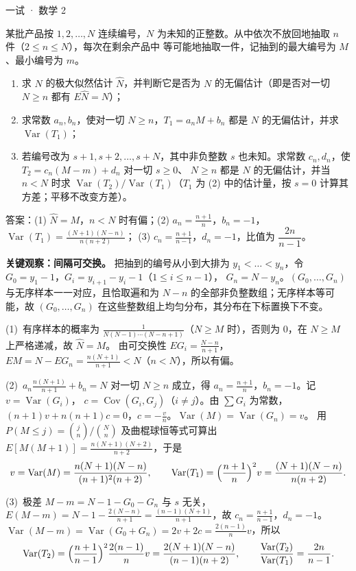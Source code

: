 \documentclass[cjk=noto, seal=first]{mojing-exam}
\begin{document}
\begin{paper}[time={建议 3 小时（训练设置）}, full=150]{一试 · 数学 2}
\begin{questions}
\question[25]
某批产品按 $1,2,\dots,N$ 连续编号，$N$ 为未知的正整数。从中依次不放回地抽取 $n$ 件（$2\le n\le N$），每次在剩余产品中
等可能地抽取一件，记抽到的最大编号为 $M$、最小编号为 $m$。
\begin{enumerate}
  \item 求 $N$ 的极大似然估计 $\hat N$，并判断它是否为 $N$ 的无偏估计（即是否对一切 $N\ge n$ 都有 $E\hat N=N$）；
  \item 求常数 $a_n,b_n$，使对一切 $N\ge n$，$T_1=a_nM+b_n$ 都是 $N$ 的无偏估计，并求 $\operatorname{Var}(T_1)$；
  \item 若编号改为 $s+1,s+2,\dots,s+N$，其中非负整数 $s$ 也未知。求常数 $c_n,d_n$，使 $T_2=c_n(M-m)+d_n$ 对一切 $s\ge0$、
        $N\ge n$ 都是 $N$ 的无偏估计，并当 $n<N$ 时求 $\operatorname{Var}(T_2)/\operatorname{Var}(T_1)$（$T_1$ 为 (2) 中的估计量，按 $s=0$ 计算其方差；平移不改变方差）。
\end{enumerate}
\answerspace{2cm}
\begin{solution}
答案：(1) $\hat N=M$，$n<N$ 时有偏；(2) $a_n=\frac{n+1}n$，$b_n=-1$，$\operatorname{Var}(T_1)=\frac{(N+1)(N-n)}{n(n+2)}$；
(3) $c_n=\frac{n+1}{n-1}$，$d_n=-1$，比值为 $\dfrac{2n}{n-1}$。

\textbf{关键观察：间隔可交换。} 把抽到的编号从小到大排为 $y_1<\dots<y_n$，令 $G_0=y_1-1$，$G_i=y_{i+1}-y_i-1$（$1\le i\le n-1$），
$G_n=N-y_n$。$(G_0,\dots,G_n)$ 与无序样本一一对应，且恰取遍和为 $N-n$ 的全部非负整数组；无序样本等可能，故 $(G_0,\dots,G_n)$
在这些整数组上均匀分布，其分布在下标置换下不变。

(1)~有序样本的概率为 $\frac{1}{N(N-1)\cdots(N-n+1)}$（$N\ge M$ 时），否则为 $0$，在 $N\ge M$ 上严格递减，故 $\hat N=M$。
由可交换性 $E G_i=\frac{N-n}{n+1}$，$EM=N-EG_n=\frac{n(N+1)}{n+1}<N$（$n<N$），所以有偏。

(2)~$a_n\frac{n(N+1)}{n+1}+b_n=N$ 对一切 $N\ge n$ 成立，得 $a_n=\frac{n+1}n$，$b_n=-1$。记 $v=\operatorname{Var}(G_i)$，
$c=\operatorname{Cov}(G_i,G_j)$（$i\ne j$）。由 $\sum G_i$ 为常数，$(n+1)v+n(n+1)c=0$，$c=-\frac vn$。$\operatorname{Var}(M)=\operatorname{Var}(G_n)=v$。
用 $P(M\le j)=\binom jn/\binom Nn$ 及曲棍球恒等式可算出 $E[M(M+1)]=\frac{n(N+1)(N+2)}{n+2}$，于是
\[
  v=\operatorname{Var}(M)=\frac{n(N+1)(N-n)}{(n+1)^2(n+2)},\qquad \operatorname{Var}(T_1)=\Bigl(\frac{n+1}{n}\Bigr)^2v=\frac{(N+1)(N-n)}{n(n+2)} .
\]

(3)~极差 $M-m=N-1-G_0-G_n$ 与 $s$ 无关，$E(M-m)=N-1-\frac{2(N-n)}{n+1}=\frac{(n-1)(N+1)}{n+1}$，故 $c_n=\frac{n+1}{n-1}$，$d_n=-1$。
$\operatorname{Var}(M-m)=\operatorname{Var}(G_0+G_n)=2v+2c=\frac{2(n-1)}{n}v$，所以
\[
  \operatorname{Var}(T_2)=\Bigl(\frac{n+1}{n-1}\Bigr)^2\frac{2(n-1)}{n}v=\frac{2(N+1)(N-n)}{(n-1)(n+2)},\qquad
  \frac{\operatorname{Var}(T_2)}{\operatorname{Var}(T_1)}=\frac{2n}{n-1}.
\]


\end{solution}
\end{questions}
\end{paper}
\end{document}
